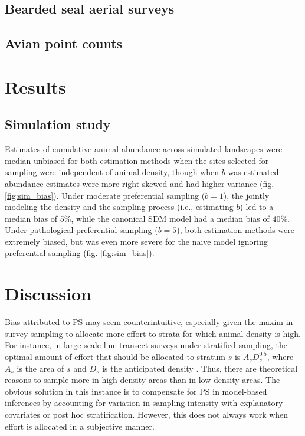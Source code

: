 \documentclass[times,mee,doublespace,]{besauth2}
\begin{document}
\subsection{Bearded seal aerial surveys}

\subsection{Avian point counts}



\section{Results}

\subsection{Simulation study}

Estimates of cumulative animal abundance across simulated landscapes were median unbiased for both estimation methods when the sites selected for sampling were independent of animal density, though when $b$ was estimated abundance estimates were more right skewed and had higher variance (fig. \ref{fig:sim_bias}).  Under moderate preferential sampling ($b=1$), the jointly modeling the density and the sampling process (i.e., estimating $b$) led to a median bias of 5\%, while the canonical SDM model had a median bias of 40\%.  Under pathological preferential sampling ($b=5$), both estimation methods were extremely biased, but was even more severe for the naive model ignoring preferential sampling (fig. \ref{fig:sim_bias}).

\section{Discussion}

Bias attributed to PS may seem counterintuitive, especially given the maxim in survey sampling to allocate more effort to strata for which animal density is high. For instance, in large scale line transect surveys under stratified sampling, the optimal amount of effort that should be allocated to stratum $s$ is $A_s D_s^{0.5}$, where $A_s$ is the area of $s$ and $D_s$ is the anticipated density \citep[][eqn 7.7]{BucklandEtAl2001}.  Thus, there are theoretical reasons to sample more in high density areas than in low density areas. The obvious solution in this instance is to compensate for PS in model-based inferences by accounting for variation in sampling intensity with explanatory covariates or post hoc stratification. However, this does not always work when effort is allocated in a subjective manner.
\end{document}

